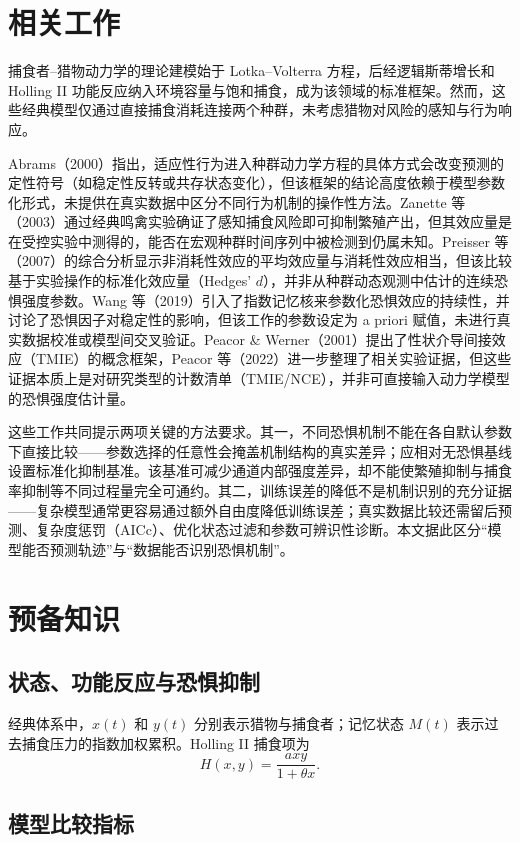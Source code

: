 \documentclass[12pt,a4paper]{ctexart}
\begin{document}
\section{相关工作}

捕食者--猎物动力学的理论建模始于 Lotka--Volterra 方程，后经逻辑斯蒂增长和 Holling II 功能反应纳入环境容量与饱和捕食，成为该领域的标准框架。然而，这些经典模型仅通过直接捕食消耗连接两个种群，未考虑猎物对风险的感知与行为响应。

Abrams（2000）指出，适应性行为进入种群动力学方程的具体方式会改变预测的定性符号（如稳定性反转或共存状态变化），但该框架的结论高度依赖于模型参数化形式，未提供在真实数据中区分不同行为机制的操作性方法。Zanette 等（2003）通过经典鸣禽实验确证了感知捕食风险即可抑制繁殖产出，但其效应量是在受控实验中测得的，能否在宏观种群时间序列中被检测到仍属未知。Preisser 等（2007）的综合分析显示非消耗性效应的平均效应量与消耗性效应相当，但该比较基于实验操作的标准化效应量（Hedges' $d$），并非从种群动态观测中估计的连续恐惧强度参数。Wang 等（2019）引入了指数记忆核来参数化恐惧效应的持续性，并讨论了恐惧因子对稳定性的影响，但该工作的参数设定为 a priori 赋值，未进行真实数据校准或模型间交叉验证。Peacor \& Werner（2001）提出了性状介导间接效应（TMIE）的概念框架，Peacor 等（2022）进一步整理了相关实验证据，但这些证据本质上是对研究类型的计数清单（TMIE/NCE），并非可直接输入动力学模型的恐惧强度估计量。

这些工作共同提示两项关键的方法要求。其一，不同恐惧机制不能在各自默认参数下直接比较——参数选择的任意性会掩盖机制结构的真实差异；应相对无恐惧基线设置标准化抑制基准。该基准可减少通道内部强度差异，却不能使繁殖抑制与捕食率抑制等不同过程量完全可通约。其二，训练误差的降低不是机制识别的充分证据——复杂模型通常更容易通过额外自由度降低训练误差；真实数据比较还需留后预测、复杂度惩罚（AICc）、优化状态过滤和参数可辨识性诊断。本文据此区分“模型能否预测轨迹”与“数据能否识别恐惧机制”。

\section{预备知识}

\subsection{状态、功能反应与恐惧抑制}

经典体系中，$x(t)$ 和 $y(t)$ 分别表示猎物与捕食者；记忆状态 $M(t)$ 表示过去捕食压力的指数加权累积。Holling II 捕食项为
\[
  H(x,y)=\frac{axy}{1+\theta x}.
\]

\subsection{模型比较指标}
\end{document}
